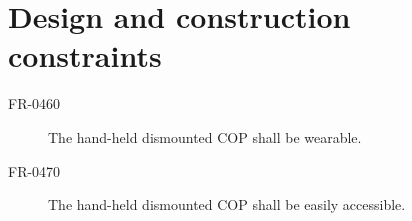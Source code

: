  \section{Design and construction constraints}
 \begin{description}
 \item[FR-0460] The hand-held dismounted COP shall be wearable.
 \item[FR-0470] The hand-held dismounted COP shall be easily accessible.
 \end{description}